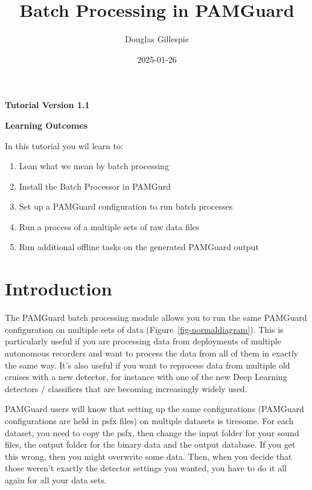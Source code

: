 \documentclass[
]{article}
\title{Batch Processing in PAMGuard}
\author[1]{Douglas Gillespie}
\affil[1]{Sea Mammal Research Unit, University of St Andrews}
\date{2025-01-26}
\renewcommand*\contentsname{Table of contents}
\newcommand\contentsname{Table of contents}
\begin{document}
\maketitle

\centerline{\textbf{Tutorial Version 1.1}}
\vspace{3cm}


\centerline{\textbf{Learning Outcomes}}

In this tutorial you wil learn to:
\begin{enumerate}
\item Lean what we mean by batch processing
\item Install the Batch Processor in PAMGurd
\item Set up a PAMGuard configuration to run batch processes
\item Run a process of a multiple sets of raw data files
\item Run additional offline tasks on the generated PAMGuard output
\end{enumerate}
\newpage

\renewcommand*\contentsname{Table of contents}
{
\hypersetup{linkcolor=}
\setcounter{tocdepth}{3}
\tableofcontents
}

\newpage{}

\section{Introduction}\label{introduction}

The PAMGuard batch processing module allows you to run the same PAMGuard
configuration on multiple sets of data (Figure~\ref{fig-normaldiagram}).
This is particularly useful if you are processing data from deployments
of multiple autonomous recorders and want to process the data from all
of them in exactly the same way. It's also useful if you want to
reprocess data from multiple old cruises with a new detector, for
instance with one of the new Deep Learning detectors / classifiers that
are becoming increasingly widely used.

PAMGuard users will know that setting up the same configurations
(PAMGuard configurations are held in psfx files) on multiple datasets is
tiresome. For each dataset, you need to copy the psfx, then change the
input folder for your sound files, the output folder for the binary data
and the output database. If you get this wrong, then you might overwrite
some data. Then, when you decide that those weren't exactly the detector
settings you wanted, you have to do it all again for all your data sets.
\end{document}
